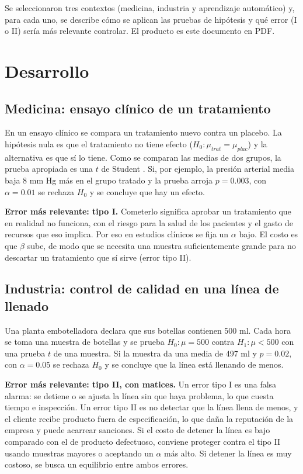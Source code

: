 \documentclass[11pt,letterpaper]{article}
\begin{document}
Se seleccionaron tres contextos (medicina, industria y aprendizaje automático) y, para cada uno, se describe cómo se aplican las pruebas de hipótesis y qué error (I o II) sería más relevante controlar. El producto es este documento en PDF.

\section{Desarrollo}

\subsection{Medicina: ensayo clínico de un tratamiento}

En un ensayo clínico se compara un tratamiento nuevo contra un placebo. La hipótesis nula es que el tratamiento no tiene efecto ($H_0\colon \mu_{trat} = \mu_{plac}$) y la alternativa es que sí lo tiene. Como se comparan las medias de dos grupos, la prueba apropiada es una $t$ de Student \parencite{tecnm2026_documento_fuente}. Si, por ejemplo, la presión arterial media baja 8 mm Hg más en el grupo tratado y la prueba arroja $p = 0.003$, con $\alpha = 0.01$ se rechaza $H_0$ y se concluye que hay un efecto.

\textbf{Error más relevante: tipo I.} Cometerlo significa aprobar un tratamiento que en realidad no funciona, con el riesgo para la salud de los pacientes y el gasto de recursos que eso implica. Por eso en estudios clínicos se fija un $\alpha$ bajo. El costo es que $\beta$ sube, de modo que se necesita una muestra suficientemente grande para no descartar un tratamiento que sí sirve (error tipo II).

\subsection{Industria: control de calidad en una línea de llenado}

Una planta embotelladora declara que sus botellas contienen 500 ml. Cada hora se toma una muestra de botellas y se prueba $H_0\colon \mu = 500$ contra $H_1\colon \mu < 500$ con una prueba $t$ de una muestra. Si la muestra da una media de 497 ml y $p = 0.02$, con $\alpha = 0.05$ se rechaza $H_0$ y se concluye que la línea está llenando de menos.

\textbf{Error más relevante: tipo II, con matices.} Un error tipo I es una falsa alarma: se detiene o se ajusta la línea sin que haya problema, lo que cuesta tiempo e inspección. Un error tipo II es no detectar que la línea llena de menos, y el cliente recibe producto fuera de especificación, lo que daña la reputación de la empresa y puede acarrear sanciones. Si el costo de detener la línea es bajo comparado con el de producto defectuoso, conviene proteger contra el tipo II usando muestras mayores o aceptando un $\alpha$ más alto. Si detener la línea es muy costoso, se busca un equilibrio entre ambos errores.
\end{document}
